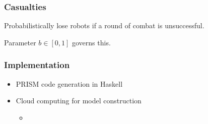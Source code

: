\documentclass{beamer}
\theoremstyle{definition}
\begin{document}
\begin{frame}
    \frametitle{Casualties}

    Probabilistically lose robots if a round of combat is unsuccessful.
    
    Parameter $ b \in [0, 1] $ governs this.
\end{frame}

\begin{frame}
    \frametitle{Implementation}

    \begin{itemize}
        \item PRISM code generation in Haskell
        \item Cloud computing for model construction
            \begin{itemize}
                \item
            \end{itemize}
    \end{itemize}
\end{frame}
\end{document}
